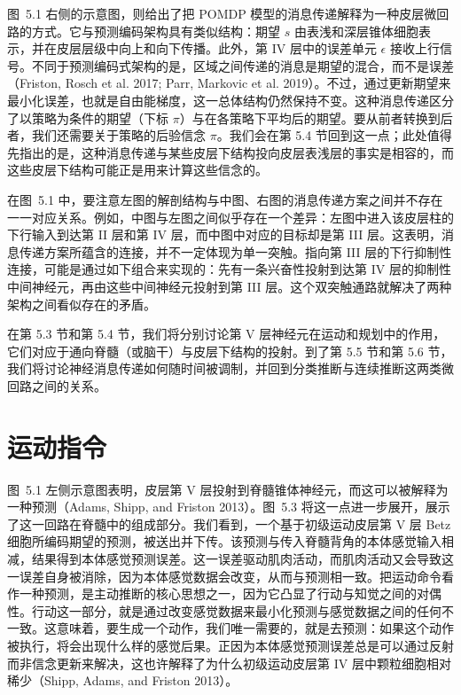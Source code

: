 图~5.1 右侧的示意图，则给出了把 POMDP 模型的消息传递解释为一种皮层微回路的方式。它与预测编码架构具有类似结构：期望 $s$ 由表浅和深层锥体细胞表示，并在皮层层级中向上和向下传播。此外，第 IV 层中的误差单元 $\epsilon$ 接收上行信号。不同于预测编码式架构的是，区域之间传递的消息是期望的混合，而不是误差（Friston, Rosch et al. 2017; Parr, Markovic et al. 2019）。不过，通过更新期望来最小化误差，也就是自由能梯度，这一总体结构仍然保持不变。这种消息传递区分了以策略为条件的期望（下标 $\pi$）与在各策略下平均后的期望。要从前者转换到后者，我们还需要关于策略的后验信念 $\pi$。我们会在第 5.4 节回到这一点；此处值得先指出的是，这种消息传递与某些皮层下结构投向皮层表浅层的事实是相容的，而这些皮层下结构可能正是用来计算这些信念的。

在图~5.1 中，要注意左图的解剖结构与中图、右图的消息传递方案之间并不存在一一对应关系。例如，中图与左图之间似乎存在一个差异：左图中进入该皮层柱的下行输入到达第 II 层和第 IV 层，而中图中对应的目标却是第 III 层。这表明，消息传递方案所蕴含的连接，并不一定体现为单一突触。指向第 III 层的下行抑制性连接，可能是通过如下组合来实现的：先有一条兴奋性投射到达第 IV 层的抑制性中间神经元，再由这些中间神经元投射到第 III 层。这个双突触通路就解决了两种架构之间看似存在的矛盾。

在第 5.3 节和第 5.4 节，我们将分别讨论第 V 层神经元在运动和规划中的作用，它们对应于通向脊髓（或脑干）与皮层下结构的投射。到了第 5.5 节和第 5.6 节，我们将讨论神经消息传递如何随时间被调制，并回到分类推断与连续推断这两类微回路之间的关系。

\section{运动指令}

图~5.1 左侧示意图表明，皮层第 V 层投射到脊髓锥体神经元，而这可以被解释为一种预测（Adams, Shipp, and Friston 2013）。图~5.3 将这一点进一步展开，展示了这一回路在脊髓中的组成部分。我们看到，一个基于初级运动皮层第 V 层 Betz 细胞所编码期望的预测，被送出并下传。该预测与传入脊髓背角的本体感觉输入相减，结果得到本体感觉预测误差。这一误差驱动肌肉活动，而肌肉活动又会导致这一误差自身被消除，因为本体感觉数据会改变，从而与预测相一致。把运动命令看作一种预测，是主动推断的核心思想之一，因为它凸显了行动与知觉之间的对偶性。行动这一部分，就是通过改变感觉数据来最小化预测与感觉数据之间的任何不一致。这意味着，要生成一个动作，我们唯一需要的，就是去预测：如果这个动作被执行，将会出现什么样的感觉后果。正因为本体感觉预测误差总是可以通过反射而非信念更新来解决，这也许解释了为什么初级运动皮层第 IV 层中颗粒细胞相对稀少（Shipp, Adams, and Friston 2013）。

